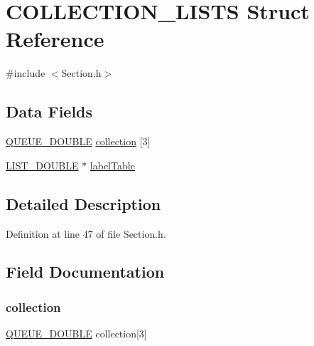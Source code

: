 \hypertarget{struct_c_o_l_l_e_c_t_i_o_n___l_i_s_t_s}{}\section{C\+O\+L\+L\+E\+C\+T\+I\+O\+N\+\_\+\+L\+I\+S\+TS Struct Reference}
\label{struct_c_o_l_l_e_c_t_i_o_n___l_i_s_t_s}


{\ttfamily \#include $<$Section.\+h$>$}

\subsection*{Data Fields}
\begin{DoxyCompactItemize}
\item 
\mbox{\hyperlink{_double_queue_generic_8h_ac9780889f9bbabed708ecbeaadfb040e}{Q\+U\+E\+U\+E\+\_\+\+D\+O\+U\+B\+LE}} \mbox{\hyperlink{struct_c_o_l_l_e_c_t_i_o_n___l_i_s_t_s_ab2a793876fc70305625749a7046b5744}{collection}} \mbox{[}3\mbox{]}
\item 
\mbox{\hyperlink{_double_list_generic_8h_a1e5b384fadfbaaa8da74a3c3212fae13}{L\+I\+S\+T\+\_\+\+D\+O\+U\+B\+LE}} $\ast$ \mbox{\hyperlink{struct_c_o_l_l_e_c_t_i_o_n___l_i_s_t_s_a83d08c725eace4faa2dce93921c1a025}{label\+Table}}
\end{DoxyCompactItemize}


\subsection{Detailed Description}


Definition at line 47 of file Section.\+h.



\subsection{Field Documentation}
\mbox{\label{struct_c_o_l_l_e_c_t_i_o_n___l_i_s_t_s_ab2a793876fc70305625749a7046b5744}} 
\subsubsection{\texorpdfstring{collection}{collection}}
{\footnotesize\ttfamily \mbox{\hyperlink{_double_queue_generic_8h_ac9780889f9bbabed708ecbeaadfb040e}{Q\+U\+E\+U\+E\+\_\+\+D\+O\+U\+B\+LE}} collection\mbox{[}3\mbox{]}}



